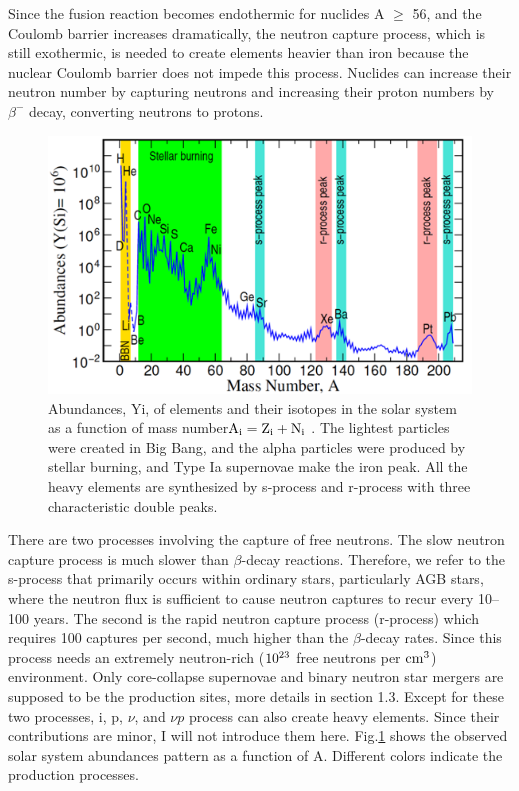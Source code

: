 \documentclass[aps,prl,preprint,groupedaddress]{revtex4}
\begin{document}
Since the fusion reaction becomes endothermic for nuclides A $\geq$ 56, and the Coulomb barrier increases dramatically, the neutron capture process, which is still exothermic, is needed to create elements heavier than iron because the nuclear Coulomb barrier does not impede this process. Nuclides can increase their neutron number by capturing neutrons and increasing their proton numbers by $\beta^-$ decay, converting neutrons to protons. 

\begin{figure}
\centering
\includegraphics[scale=0.6]{solar_abunds}
\caption{
Abundances, Yi, of elements and their isotopes in the solar system as a function of mass number$\rm{A_i = Z_i + N_i}$ \cite{RevModPhys.93.015002}. The lightest particles were created in Big Bang, and the alpha particles were produced by stellar burning, and Type Ia supernovae make the iron peak. All the heavy elements are synthesized by s-process and r-process with three characteristic double peaks.
} 
\label{fig:solar_abunds}
\end{figure}
There are two processes involving the capture of free neutrons. The slow neutron capture process is much slower than $\beta$-decay reactions. Therefore, we refer to the s-process that primarily occurs within ordinary stars, particularly AGB stars, where the neutron flux is sufficient to cause neutron captures to recur every 10–100 years. The second is the rapid neutron capture process (r-process) which requires 100 captures per second, much higher than the $\beta$-decay rates. Since this process needs an extremely neutron-rich ($\rm{10^{23}}$ free neutrons per $\rm{cm^3}$)\cite{1957RvMP...29..547B} environment. Only core-collapse supernovae and binary neutron star mergers are supposed to be the production sites, more details in section 1.3. Except for these two processes, i, p, $\nu$, and $\nu p$ process can also create heavy elements. Since their contributions are minor, I will not introduce them here. Fig.\ref{fig:solar_abunds} shows the observed solar system abundances pattern as a function of A. Different colors indicate the production processes.  
\end{document}
